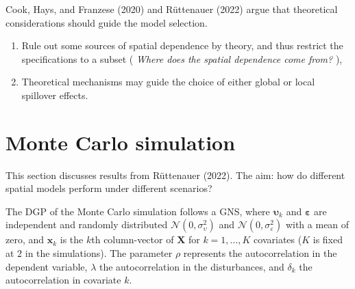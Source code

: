 \documentclass[
  letterpaper,
  DIV=11,
  numbers=noendperiod]{scrreprt}
\begin{document}
Cook, Hays, and Franzese (2020) and Rüttenauer (2022) argue that
theoretical considerations should guide the model selection.

\begin{enumerate}
\def\labelenumi{\arabic{enumi})}
\item
  Rule out some sources of spatial dependence by theory, and thus
  restrict the specifications to a subset ( \emph{Where does the spatial
  dependence come from?} ),
\item
  Theoretical mechanisms may guide the choice of either global or local
  spillover effects.
\end{enumerate}

\hypertarget{monte-carlo-simulation}{%
\section{Monte Carlo simulation}\label{monte-carlo-simulation}}

This section discusses results from Rüttenauer (2022). The aim: how do
different spatial models perform under different scenarios?

The DGP of the Monte Carlo simulation follows a GNS, where
\({\boldsymbol{\mathbf{\upsilon}}}_k\) and
\({\boldsymbol{\mathbf{\varepsilon}}}\) are independent and randomly
distributed \(\mathcal{N}(0,\sigma^{2}_\upsilon)\) and
\(\mathcal{N}(0,\sigma^{2}_\varepsilon)\) with a mean of zero, and
\({\boldsymbol{\mathbf{x}}}_k\) is the \(k\)th column-vector of
\({\boldsymbol{\mathbf{X}}}\) for \(k=1,...,K\) covariates (\(K\) is
fixed at \(2\) in the simulations). The parameter \(\rho\) represents
the autocorrelation in the dependent variable, \(\lambda\) the
autocorrelation in the disturbances, and \(\delta_k\) the
autocorrelation in covariate \(k\).
\end{document}
